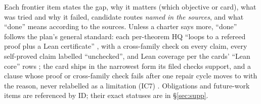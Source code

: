 Each frontier item states the gap, why it matters (which objective or card), what was tried and why it failed, candidate routes \emph{named in the sources}, and what ``done'' means according to the sources. Unless a charter says more, ``done'' follows the plan's general standard: each per-theorem HQ ``loops to a refereed proof plus a Lean certificate'' , with a cross-family check on every claim, every self-proved claim labelled ``unchecked'', and Lean coverage per the cards' ``Lean core'' rows ; the card ships in the narrowest form its filed checks support, and a clause whose proof or cross-family check fails after one repair cycle moves to  with the reason, never relabelled as a limitation (IC7) . Obligations and future-work items are referenced by ID; their exact statuses are in \S\ref{sec:supp}.

